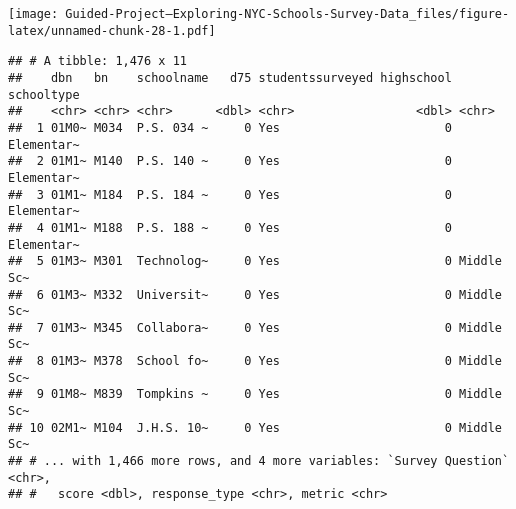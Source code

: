 \documentclass[]{article}
\newenvironment{Shaded}{\begin{snugshade}}{\end{snugshade}}
\newcommand{\DecValTok}[1]{\textcolor[rgb]{0.00,0.00,0.81}{#1}}
\newcommand{\KeywordTok}[1]{\textcolor[rgb]{0.13,0.29,0.53}{\textbf{#1}}}
\newcommand{\NormalTok}[1]{#1}
\newcommand{\OperatorTok}[1]{\textcolor[rgb]{0.81,0.36,0.00}{\textbf{#1}}}
\newcommand{\StringTok}[1]{\textcolor[rgb]{0.31,0.60,0.02}{#1}}
\begin{document}
\texttt{[image: Guided-Project--Exploring-NYC-Schools-Survey-Data\_files/figure-latex/unnamed-chunk-28-1.pdf]}

\begin{Shaded}
\end{Shaded}

\begin{verbatim}
## # A tibble: 1,476 x 11
##    dbn   bn    schoolname   d75 studentssurveyed highschool schooltype
##    <chr> <chr> <chr>      <dbl> <chr>                 <dbl> <chr>     
##  1 01M0~ M034  P.S. 034 ~     0 Yes                       0 Elementar~
##  2 01M1~ M140  P.S. 140 ~     0 Yes                       0 Elementar~
##  3 01M1~ M184  P.S. 184 ~     0 Yes                       0 Elementar~
##  4 01M1~ M188  P.S. 188 ~     0 Yes                       0 Elementar~
##  5 01M3~ M301  Technolog~     0 Yes                       0 Middle Sc~
##  6 01M3~ M332  Universit~     0 Yes                       0 Middle Sc~
##  7 01M3~ M345  Collabora~     0 Yes                       0 Middle Sc~
##  8 01M3~ M378  School fo~     0 Yes                       0 Middle Sc~
##  9 01M8~ M839  Tompkins ~     0 Yes                       0 Middle Sc~
## 10 02M1~ M104  J.H.S. 10~     0 Yes                       0 Middle Sc~
## # ... with 1,466 more rows, and 4 more variables: `Survey Question` <chr>,
## #   score <dbl>, response_type <chr>, metric <chr>
\end{verbatim}
\end{document}
